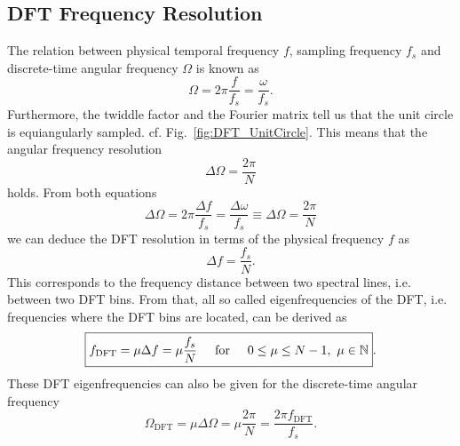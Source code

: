 \documentclass[11pt,a4paper,DIV=12]{scrartcl}
\begin{document}
\subsection{DFT Frequency Resolution}
The relation between physical temporal frequency $f$, sampling frequency $f_s$
and discrete-time angular frequency $\Omega$ is known as
\begin{equation}
\Omega=2\pi \frac{f}{f_s}=\frac{\omega}{f_s}.
\end{equation}
%
Furthermore, the twiddle factor and the Fourier matrix tell us that
the unit circle is equiangularly sampled. cf. Fig.~\ref{fig:DFT_UnitCircle}.
%
This means that the angular frequency resolution
\begin{equation}
\Delta \Omega = \frac{2\pi}{N}
\end{equation}
holds.
%
From both equations
\begin{equation}
\Delta \Omega=2\pi \frac{\Delta f}{f_s}=\frac{\Delta \omega}{f_s}\equiv
\Delta \Omega = \frac{2\pi}{N}
\end{equation}
we can deduce the DFT resolution in terms of the physical frequency $f$ as
\begin{equation}
\boxed{\Delta f = \frac{f_s}{N}}.
\end{equation}
%
This corresponds to the frequency distance between two spectral lines, i.e.
between two DFT bins.
%
From that, all so called eigenfrequencies of the DFT, i.e. frequencies where
the DFT bins are located, can be derived as
\begin{equation}
\boxed{f_\text{DFT}=\mu \Delta f=\mu\frac{f_s}{N}
\hspace{5mm}\text{for}\hspace{5mm}
0\leq \mu\leq N-1,\,\,\mu\in\mathbb{N}}.
\end{equation}
%
These DFT eigenfrequencies can also be given for the discrete-time angular
frequency
\begin{equation}
\Omega_\text{DFT} =
\mu \Delta \Omega =
\mu \frac{2\pi}{N} =
\frac{2\pi f_\text{DFT}}{f_s}.
\label{eq:OmegaDFT}
\end{equation}

\end{document}
